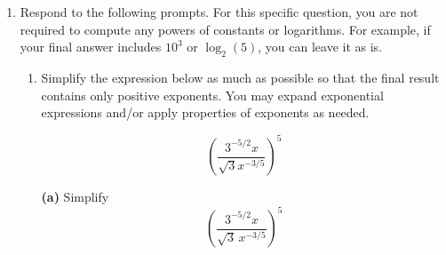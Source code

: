 \documentclass[11pt]{article}
\newcommand{\blue}[1]{{\color{blue}#1}}
\begin{document}
\begin{enumerate}
\begin{enumerate}
    \textcolor{blue}{\textbf{Solution:} Choice ii best describes Sam's drive.\\
    The derivative $s'(t)$ represents the speed of Sam's driving in this scenario.\\
    At around 4 mins and around 10 mins, the graph appears to have horizontal tangent lines, indicating the derivative, or the speed, is $0$ at these times. This matches the two stops in choice ii.\\
    The slope of the graph (which represents the derivative) from about 4.5 mins to 9.5 mins is clearly less than the slope from about 11.5 mins to 18 mins. This matches the fact that Sam first drives on a main road and then a highway in choice ii, since the speed on a highway should be faster than the speed on a main road.}

    \item Rank the values of $s'(10)$, $s'(14)$, and $s'(19)$ from smallest to largest. No explanation required.

    \vspace{0.5cm}
    \textcolor{blue}{\textbf{Solution:} 
    \begin{center}
    \blue{$s'(10)<s'(19)<s'(14)$}
    \end{center}}
\end{enumerate}


\newpage


\item Respond to the following prompts. For this specific question, you are not required to compute any powers of constants or logarithms. For example, if your final answer includes $10^3$ or $\log_2(5)$, you can leave it as is.

\begin{enumerate}
    \item Simplify the expression below as much as possible so that the final result contains only positive exponents. You may expand exponential expressions and/or apply properties of exponents as needed. 

    \[\left(\dfrac{3^{-5/2}x}{\sqrt{3}x^{-3/5}}\right)^5\]
{
\color{blue}
\textbf{(a)} Simplify
\[
\left(\dfrac{3^{-5/2}x}{\sqrt{3}\,x^{-3/5}}\right)^5
\]

}
\end{enumerate}
\end{enumerate}
\end{document}
